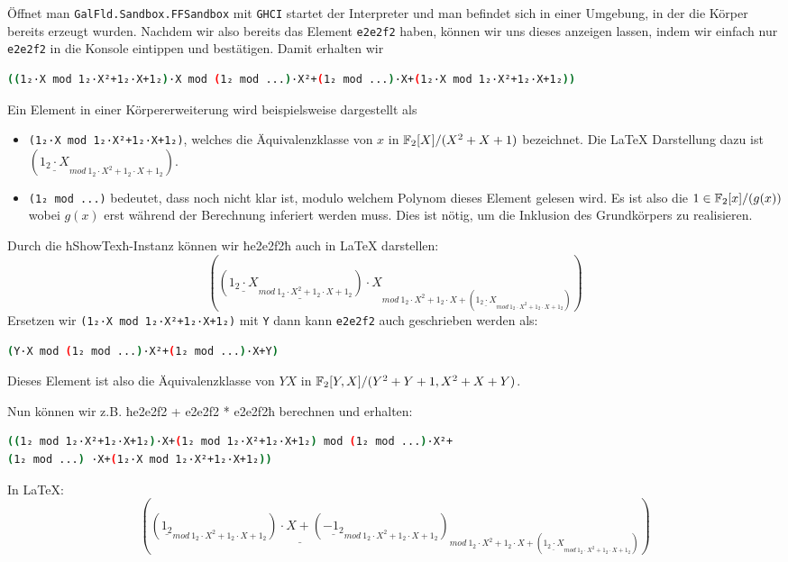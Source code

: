 Öffnet man \texttt{GalFld.Sandbox.FFSandbox} mit \texttt{GHCI} startet der
Interpreter und man befindet sich in einer Umgebung, in der die Körper bereits
erzeugt wurden. Nachdem wir also bereits das Element \texttt{e2e2f2} haben,
können wir uns dieses anzeigen lassen, indem wir einfach nur \texttt{e2e2f2} in
die Konsole eintippen und bestätigen. Damit erhalten wir
\begin{lstlisting}[language=bash
                  ,numbers=none
                  ,frame=L]
((1₂·X mod 1₂·X²+1₂·X+1₂)·X mod (1₂ mod ...)·X²+(1₂ mod ...)·X+(1₂·X mod 1₂·X²+1₂·X+1₂))
\end{lstlisting}
Ein Element in einer Körpererweiterung wird beispielsweise dargestellt als
\begin{itemize}
  \item \texttt{(1₂·X mod 1₂·X²+1₂·X+1₂)}, welches die Äquivalenzklasse von $x$
  in $\mathbb{F}_2[X]/(X^2+X+1)$ bezeichnet. Die \LaTeX{} Darstellung dazu ist 
  $\left(
      \underline{
        1_{2}
        \cdot{}X
      }_{
        mod~1_{2} \cdot{}X^{2}+1_{2}\cdot{}X+1_{2}
      }
    \right)$.
  \item \texttt{(1₂ mod ...)} bedeutet, dass noch nicht klar ist, modulo
  welchem Polynom dieses Element gelesen wird. Es ist also die
  $1\in\mathbb{F}_2[x]/(g(x))$
  wobei $g(x)$ erst während der Berechnung inferiert werden muss.
  Dies ist nötig, um die Inklusion des Grundkörpers zu realisieren.
\end{itemize}
Durch die ħShowTexħ-Instanz können wir ħe2e2f2ħ auch in \LaTeX{} darstellen:
\[
\left(
  \underline{
    \left(
      \underline{
        1_{2}
        \cdot{}X
      }_{
        mod~1_{2} \cdot{}X^{2}+1_{2}\cdot{}X+1_{2}
      }
    \right)\cdot{}X
  }_{
    mod~1_{2}\cdot{}X^{2}+1_{2}\cdot{}X+\left(
      \underline{
        1_{2}\cdot{}X
      }_{
        mod~1_{2}\cdot{}X^{2}+1_{2}\cdot{}X+1_{2}
      }
    \right)
  }
\right)
\]
Ersetzen wir \texttt{(1₂·X mod 1₂·X²+1₂·X+1₂)} mit \texttt{Y} dann kann
\texttt{e2e2f2} auch geschrieben werden als:
\begin{lstlisting}[language=bash
                  ,numbers=none
                  ,frame=L]
(Y·X mod (1₂ mod ...)·X²+(1₂ mod ...)·X+Y)
\end{lstlisting}
Dieses Element ist also die Äquivalenzklasse von $YX$ in
$\mathbb{F}_2[Y,X]/(Y^2+Y+1,X^2+X+Y)$.

Nun können wir z.B.
ħe2e2f2 + e2e2f2 * e2e2f2ħ berechnen und erhalten:
\begin{lstlisting}[language=bash
                  ,numbers=none
                  ,frame=L]
((1₂ mod 1₂·X²+1₂·X+1₂)·X+(1₂ mod 1₂·X²+1₂·X+1₂) mod (1₂ mod ...)·X²+
(1₂ mod ...) ·X+(1₂·X mod 1₂·X²+1₂·X+1₂))
\end{lstlisting}
In \LaTeX{}:
\[
\left(
  \underline{
    \left(
      \underline{
        1_{2}
      }_{
        mod~1_{2}\cdot{}X^{2}+1_{2}\cdot{}X+1_{2}
      }
    \right)
    \cdot{}X+\left(
      \underline{
        -1_{2}
      }_{
        mod~1_{2}\cdot{}X^{2}+1_{2}\cdot{}X+1_{2}
      }
    \right)
  }_{
    mod~1_{2}\cdot{}X^{2}+1_{2}\cdot{}X+\left(
      \underline{
        1_{2}\cdot{}X
      }_{
        mod~1_{2}\cdot{}X^{2}+1_{2}\cdot{}X+1_{2}
      }
    \right)
  }
  \right)
\]

